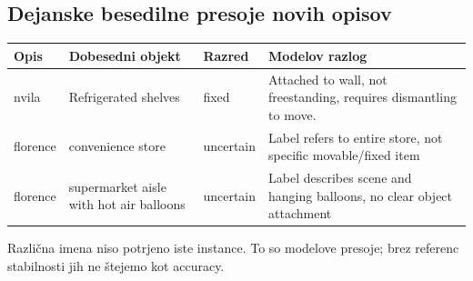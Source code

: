 \documentclass[10pt,a4paper]{article}
\begin{document}
\subsection*{Dejanske besedilne presoje novih opisov}\begin{center}\small\begin{tabular}{p{1.6cm}p{4.2cm}p{1.8cm}p{7.6cm}}\toprule
Opis & Dobesedni objekt & Razred & Modelov razlog \\ \midrule
nvila & Refrigerated shelves & fixed & Attached to wall, not freestanding, requires dismantling to move. \\
florence & convenience store & uncertain & Label refers to entire store, not specific movable/fixed item \\
florence & supermarket aisle with hot air balloons & uncertain & Label describes scene and hanging balloons, no clear object attachment \\
\bottomrule\end{tabular}\end{center}
Različna imena niso potrjeno iste instance. To so modelove presoje; brez referenc stabilnosti jih ne štejemo kot accuracy.

\newpage
\end{document}
